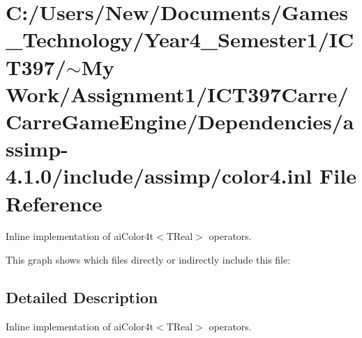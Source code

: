 \hypertarget{color4_8inl}{
\section{C:/Users/New/Documents/Games\_\-Technology/Year4\_\-Semester1/ICT397/$\sim$My Work/Assignment1/ICT397Carre/CarreGameEngine/Dependencies/assimp-4.1.0/include/assimp/color4.inl File Reference}
\label{color4_8inl}
}
Inline implementation of aiColor4t$<$TReal$>$ operators. 



This graph shows which files directly or indirectly include this file:

\subsection{Detailed Description}
Inline implementation of aiColor4t$<$TReal$>$ operators. 


